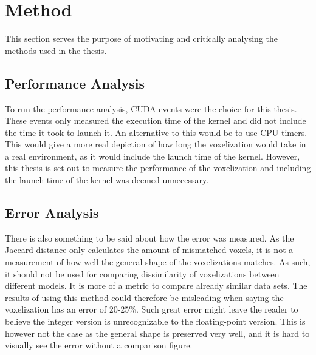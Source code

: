 

\vfill

\section{Method}
This section serves the purpose of motivating and critically analysing the methods used in the thesis. 

 


\subsection{Performance Analysis}
To run the performance analysis, CUDA events were the choice for this thesis.
These events only measured the execution time of the kernel and did not include the time it took to launch it.
An alternative to this would be to use CPU timers.
This would give a more real depiction of how long the voxelization would take in a real environment, as it would include the launch time of the kernel.
However, this thesis is set out to measure the performance of the voxelization and including the launch time of the kernel was deemed unnecessary.

\subsection{Error Analysis}
There is also something to be said about how the error was measured.
As the Jaccard distance only calculates the amount of mismatched voxels, it is not a measurement of how well the general shape of the voxelizations matches.
As such, it should not be used for comparing dissimilarity of voxelizations between different models.
It is more of a metric to compare already similar data sets.
The results of using this method could therefore be misleading when saying the voxelization has an error of 20-25\%.
Such great error might leave the reader to believe the integer version is unrecognizable to the floating-point version.
This is however not the case as the general shape is preserved very well, and it is hard to visually see the error without a comparison figure. 

